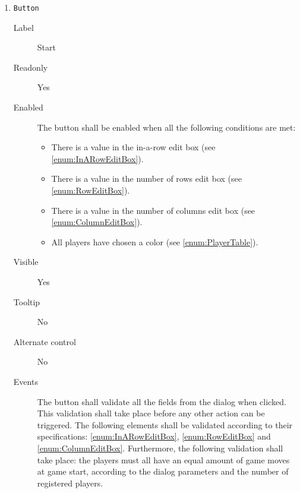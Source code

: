 \begin{enumerate}
    \item \texttt{Button}  \label{enum:StartButton}
              \begin{description}
                  \item[Label] Start
                  \item[Readonly] Yes
                  \item[Enabled] The button shall be enabled when all the following
                                 conditions are met:
                      \begin{itemize}
                          \item There is a value in the in-a-row edit box
                                (see \cref{enum:InARowEditBox}).
                          \item There is a value in the number of rows edit box
                                (see \cref{enum:RowEditBox}).
                          \item There is a value in the number of columns edit box
                                (see \cref{enum:ColumnEditBox}).
                          \item All players have chosen a color
                                (see \cref{enum:PlayerTable}).
                      \end{itemize}
                  \item[Visible] Yes
                  \item[Tooltip] No
                  \item[Alternate control] No
                  \item[Events] The button shall validate all the fields from the dialog
                                when clicked. This validation shall take place before any
                                other action can be triggered. The following elements shall
                                be validated according to their specifications:
                                \cref{enum:InARowEditBox}, \cref{enum:RowEditBox} and
                                \cref{enum:ColumnEditBox}. Furthermore, the following
                                validation shall take place: the players must all have an
                                equal amount of game moves at game start, according to the
                                dialog parameters and the number of registered players.
              \end{description}

\end{enumerate}

